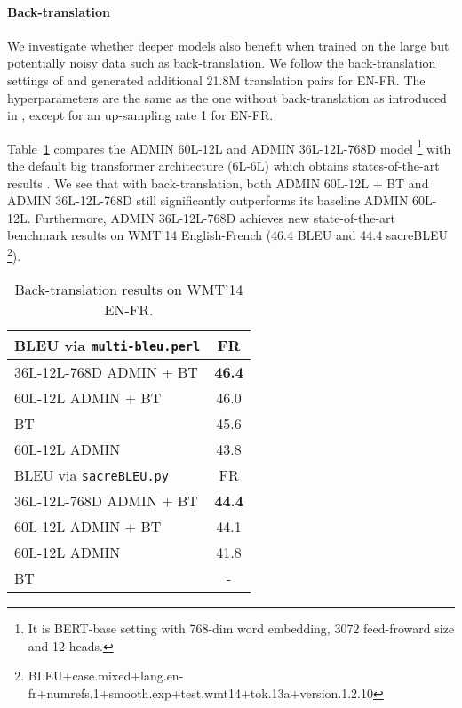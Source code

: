 \documentclass[11pt,a4paper]{article}
\begin{document}
\paragraph{Back-translation}
We investigate whether deeper models also benefit when trained on the large but potentially noisy data such as back-translation. We follow the back-translation settings of \cite{edunov2018back-nmt} and generated additional 21.8M translation pairs for EN-FR. The hyperparameters are the same as the one without back-translation as introduced in \cite{edunov2018back-nmt}, except for an up-sampling rate 1 for EN-FR.

Table~\ref{tab:admin-bt} compares the ADMIN 60L-12L and ADMIN 36L-12L-768D model \footnote{It is BERT-base setting with 768-dim word embedding, 3072 feed-froward size and 12 heads.} with the default big transformer architecture (6L-6L) which obtains states-of-the-art results \cite{edunov2018back-nmt}. We see that with back-translation, both ADMIN 60L-12L + BT and ADMIN 36L-12L-768D still significantly outperforms its baseline ADMIN 60L-12L. Furthermore, ADMIN 36L-12L-768D achieves new state-of-the-art benchmark results on WMT'14 English-French (46.4 BLEU and 44.4 sacreBLEU \footnote{BLEU+case.mixed+lang.en-fr+numrefs.1+smooth.exp+test.wmt14+tok.13a+version.1.2.10}).

\begin{table}[ht]
    \centering
    \begin{tabular}{|l|c|}
    \hline
        BLEU via \texttt{multi-bleu.perl} & FR  \\\hline
        36L-12L-768D ADMIN + BT & {\bf 46.4}  \\
        60L-12L ADMIN + BT & 46.0  \\
       BT \cite{edunov2018back-nmt} & 45.6 \\
        60L-12L ADMIN & 43.8  \\ 
\hline\hline
BLEU via \texttt{sacreBLEU.py} & FR \\\hline
        36L-12L-768D ADMIN + BT & {\bf 44.4}  \\
        60L-12L ADMIN + BT & 44.1  \\
        60L-12L ADMIN & 41.8  \\
BT \cite{edunov2018back-nmt} & - \\
        \hline
    \end{tabular}
    \caption{Back-translation results on WMT'14 EN-FR.}
    \label{tab:admin-bt}
\vspace{-4mm}    
\end{table} 
\end{document}
